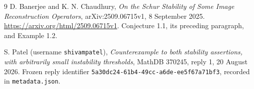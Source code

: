 \documentclass[11pt]{article}
\begin{document}
\begin{thebibliography}{9}
D. Banerjee and K. N. Chaudhury,
\emph{On the Schur Stability of Some Image Reconstruction Operators},
arXiv:2509.06715v1, 8 September 2025.
\url{https://arxiv.org/html/2509.06715v1}.
Conjecture 1.1, its preceding paragraph, and Example 1.2.

S. Patel (username \nolinkurl{shivampatel}),
\emph{Counterexample to both stability assertions, with arbitrarily small
instability thresholds}, MathDB 370245, reply 1, 20 August 2026.
Frozen reply identifier
\nolinkurl{5a30dc24-61b4-49cc-a6de-ee5f67a71bf3},
recorded in \nolinkurl{metadata.json}.
\end{thebibliography}
\end{document}
